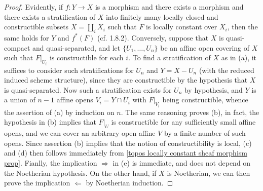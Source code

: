 \begin{proof}
Evidently, if $f:Y\to X$ is a morphism and there exists a morphism and there exists a stratification of $X$ into finitely many locally closed and constructible subsets $X=\coprod_iX_i$ such that $F$ is locally constant over $X_i$, then the same holds for $Y$ and $f^*(F)$ (cf. \cite{EGA4} 1.8.2). Conversely, suppose that $X$ is quasi-compact and quasi-separated, and let $\{U_1,\dots,U_n\}$ be an affine open covering of $X$ such that $F|_{U_i}$ is constructible for each $i$. To find a stratification of $X$ as in (a), it suffices to consider such stratifications for $U_n$ and $Y=X-U_n$ (with the reduced induced scheme structure), since they are constructible by the hypothesis that $X$ is quasi-separated. Now such a stratification exists for $U_n$ by hypothesis, and $Y$ is a union of $n-1$ affine opens $V_i=Y\cap U_i$ with $F|_{V_i}$ being constructible, whence the assertion of (a) by induction on $n$. The same reasoning proves (b), in fact, the hypothesis in (b) implies that $F|_U$ is constructible for any sufficiently small affine opens, and we can cover an arbitrary open affine $V$ by a finite number of such opens. Since assertion (b) implies that the notion of constructibility is local, (c) and (d) then follows immediately from \cref{topos locally constant sheaf morphism prop}. Fianlly, the implication $\Rightarrow$ in (e) is immediate, and does not depend on the Noetherian hypothesis. On the other hand, if $X$ is Noetherian, we can then prove the implication $\Leftarrow$ by Noetherian induction.
\end{proof}

